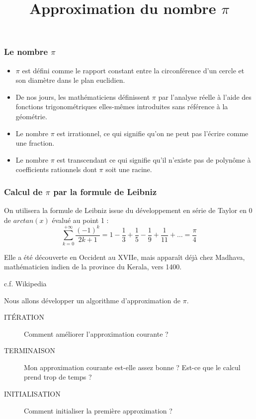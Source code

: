 \documentclass[10pt]{beamer}
\title{Approximation du nombre $\pi$}
\begin{document}
\maketitle



\begin{frame}
  \frametitle{Le nombre $\pi$}
  \begin{itemize}
  \item $\pi$ est défini comme le rapport constant entre la circonférence d’un cercle et son diamètre dans le plan euclidien.
  \item De nos jours, les mathématiciens définissent $\pi$ par l’analyse réelle à l’aide des fonctions trigonométriques elles-mêmes introduites sans référence à la géométrie.
  \item Le nombre $\pi$ est \alert{irrationnel}, ce qui signifie qu'on ne peut pas l’écrire comme une fraction.
  \item Le nombre $\pi$ est \alert{transcendant} ce qui signifie qu'il n’existe pas de polynôme à coefficients rationnels dont $\pi$ soit une racine.
  \end{itemize}
\end{frame}


\begin{frame}
  \frametitle{Calcul de $\pi$ par la formule de Leibniz}
  On utilisera la formule de Leibniz issue du développement en série de Taylor en 0 de $arctan(x)$ évalué au point 1 :
  \alert{
    \[
      \sum_{k=0}^{+\infty} \frac{(-1)^k}{2k+ 1} = 1 - \frac{1}{3} + \frac{1}{5}  - \frac{1}{9} + \frac{1}{11} + \ldots = \frac{\pi}{4}
    \]
    }

Elle a été découverte en Occident au XVIIe, mais apparaît déjà chez Madhava, mathématicien indien de la province du Kerala, vers 1400.
\begin{flushright}
c.f. Wikipedia
\end{flushright}

Nous allons développer un algorithme d'approximation de $\pi$.
  \begin{description}
  \item[ITÉRATION] Comment améliorer l'approximation courante ?
  \item[TERMINAISON] Mon approximation courante est-elle assez bonne ? Est-ce que le calcul prend trop de temps ?
  \item[INITIALISATION] Comment initialiser la première approximation ?
  \end{description}

\end{frame}
\end{document}

